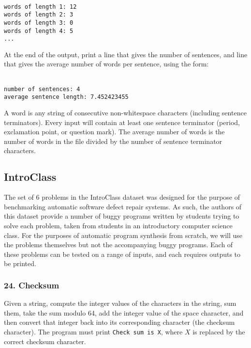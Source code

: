 \documentclass{sig-alternate}
\begin{document}
\texttt{ \\
words of length 1: 12 \\
words of length 2: 3 \\
words of length 3: 0 \\
words of length 4: 5 \\
... \\
} %

\noindent At the end of the output, print a line that gives the number of sentences, and line that gives the average number of words per sentence, using the form:

\texttt{ \\
number of sentences: 4 \\
average sentence length: 7.452423455 \\
} %

\noindent A word is any string of consecutive non-whitespace characters (including sentence terminators). Every input will contain at least one sentence terminator (period, exclamation point, or question mark). The average number of words is the number of words in the file divided by the number of sentence terminator characters.

\subsection{IntroClass}


The set of 6 problems in the IntroClass dataset \cite{ManyBugsAndIntroClass, Brun13TRgptest} was designed for the purpose of benchmarking automatic software defect repair systems. As such, the authors of this dataset provide a number of buggy programs written by students trying to solve each problem, taken from students in an introductory computer science class. For the purposes of automatic program synthesis from scratch, we will use the problems themselves but not the accompanying buggy programs. 
Each of these problems can be tested on a range of inputs, and each requires outputs to be printed.

\subsubsection*{24. Checksum}
Given a string, compute the integer values of the characters in the string, sum them, take the sum modulo 64, add the integer value of the space character, and then convert that integer back into its corresponding character (the checksum character). The program must print \texttt{Check sum is X}, where $X$ is replaced by the correct checksum character.
\end{document}
